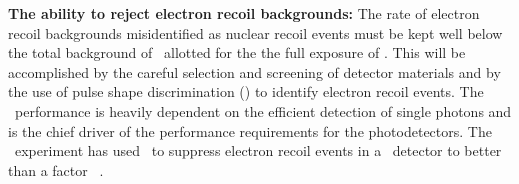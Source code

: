 \begin{asparaenum}


\item[\bf The ability to reject electron recoil backgrounds:]
The rate of electron recoil backgrounds misidentified as nuclear recoil events must be kept well below the total background of \BackgroundFreeRequirement\ allotted for the the full exposure of \DSkExtendedExposure. This will be accomplished by the careful selection and screening of detector materials and by the use of pulse shape discrimination (\PSD) to identify electron recoil events. The \PSD\ performance is heavily dependent on the efficient detection of single photons and is the chief driver of the performance requirements for the photodetectors. The \DEAP\ experiment has used \PSD\ to suppress electron recoil events in a \LAr\ detector to better than a factor \DEAPPSDRejection~\cite{Amaudruz:2018gr}. 


\end{asparaenum}
